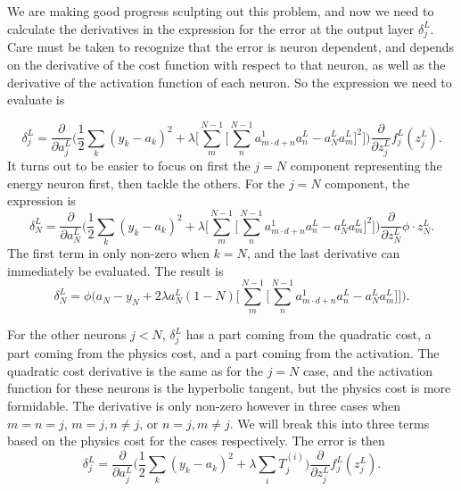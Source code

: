We are making good progress sculpting out this problem, and now we need to calculate 
the derivatives in the expression for the error at the output layer $\delta^L_j$. Care 
must be taken to recognize that the error is neuron dependent, and depends on the 
derivative of the cost function with respect to that neuron, as well as the derivative of the 
activation function of each neuron. So the expression we need to evaluate is
\begin{widetext}
\begin{equation}
	\delta^L_j =
	\frac{\partial}{\partial a^L_j} 
	\Big(
	\frac{1}{2} \sum_k (y_k - a_k)^2 +
	\lambda \Big[ \sum^{N-1}_m \big[\sum^{N-1}_n a^1_{m \cdot d + n} a^L_n - a^L_N a^L_m \big]^2 \Big]
	\Big)
	\frac{\partial}{\partial z^L_j}
	f^L_j(z^L_j).
\end{equation}
It turns out to be easier to focus on first the $j = N$ component representing the energy 
neuron first, then tackle the others. For the $j = N$ component, the expression is 
\begin{equation}
	\delta^L_N =
	\frac{\partial}{\partial a^L_N} 
	\Big(
	\frac{1}{2} \sum_k (y_k - a_k)^2 +
	\lambda \Big[ \sum^{N-1}_m \big[\sum^{N-1}_n a^1_{m \cdot d + n} a^L_n - a^L_N a^L_m \big]^2 \Big]
	\Big)
	\frac{\partial}{\partial z^L_N}
	\phi \cdot z^L_N.
\end{equation}
The first term in only non-zero when $k = N$, and the last derivative can immediately be evaluated.
The result is
\begin{equation}
	\delta^L_N = \phi 
	\Big(
		a_N - y_N + 2 \lambda a^L_N (1 - N)
		\Big[ 
			\sum^{N-1}_m 
			\big[
				\sum^{N-1}_n a^1_{m \cdot d + n} a^L_n - a^L_N a^L_m 
			\big] 
		\Big]
	\Big).
\end{equation}
\end{widetext}
For the other neurons $j < N$, $\delta^L_j$ has a part coming from the
quadratic cost, a part coming from the physics cost, and a part coming from the
activation. The quadratic cost derivative is the same as for the $j = N$ case,
and the activation function for these neurons is the hyperbolic tangent, but
the physics cost is more formidable. The derivative is only non-zero however in
three cases when $m = n = j$, $m = j, n \ne j$, or $n = j, m \ne j$. We will
break this into three terms based on the physics cost for the cases
respectively. The error is then 
\begin{equation}
	\delta^L_j =
	\frac{\partial}{\partial a^L_j} 
	\Big(
	\frac{1}{2} \sum_k (y_k - a_k)^2 +
	\lambda \sum_i T^{(i)}_j 
	\Big)
	\frac{\partial}{\partial z^L_j}
	f^L_j(z^L_j).
\end{equation}
